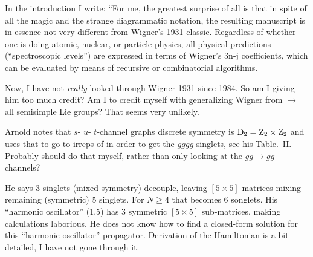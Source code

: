 \begin{description}
In the introduction I write:
``For me, the greatest surprise of all is that in spite of all the magic
and the strange diagrammatic notation, the resulting manuscript is in
essence not very different from Wigner's 1931 classic. Regardless of
whether one is doing atomic, nuclear, or particle physics, all physical
predictions (``spectroscopic levels'') are expressed in terms of
Wigner's 3n-j coefficients, which can be evaluated by means of recursive or
combinatorial algorithms.

Now, I have not {\em really} looked through Wigner 1931 since 1984. So am
I giving him too much credit? Am I to credit myself with generalizing
Wigner from  $\to$ all semisimple Lie groups? That seems very
unlikely.

Arnold notes that $s$- $u$- $t$-channel graphs discrete symmetry is
$\textrm{D}_{2}=\textrm{Z}_{2}\times\textrm{Z}_{2}$ and uses that to go to irreps of  in
order to get the $gggg$ singlets, see his Table.~II.
Probably should do that myself, rather
than only looking at the $gg\to{gg}$ channels?

He says 3 singlets (mixed symmetry) decouple, leaving $[5\!\times\!5]$
matrices mixing remaining (symmetric) 5 singlets. For $N\geq4$ that
becomes 6 songlets. His ``harmonic oscillator'' (1.5) has 3 symmetric
$[5\!\times\!5]$ sub-matrices, making calculations laborious. He does not
know how to find a closed-form solution for this ``harmonic oscillator''
propagator. Derivation of the Hamiltonian is a bit detailed, I have not
gone through it.


\end{description}


\printbibliography[heading=subbibintoc,title={References}]
